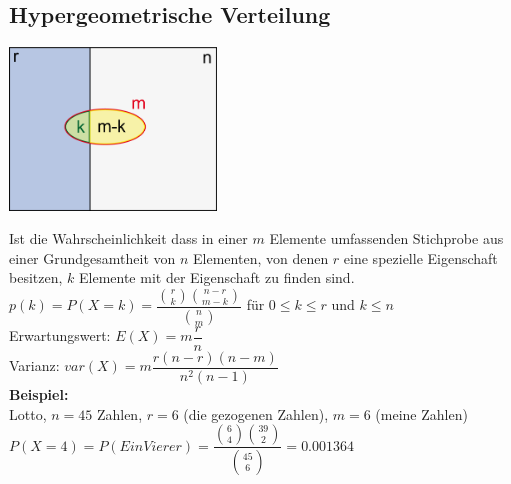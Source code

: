 	\subsection{Hypergeometrische Verteilung  }
	    \begin{floatingfigure}[r]{5.5cm}
        	\includegraphics[width=5.5cm]{./bilder/hypergeo.png}
        \end{floatingfigure}
        Ist die Wahrscheinlichkeit dass in einer $m$ Elemente umfassenden 
		Stichprobe aus einer Grundgesamtheit von $n$ Elementen, von denen $r$ eine
		spezielle Eigenschaft besitzen, $k$ Elemente mit der Eigenschaft zu
		finden sind.\\
		\vspace{5mm} 
		$p(k)=P(X=k)=\dfrac{\binom r k \binom{n-r}{m-k}}{\binom n m}$ 
        \hspace{10mm} für $0\leq k \leq r$ und $k \leq n$\\
        Erwartungswert: \hspace{10mm} $E(X)=m \dfrac{r}{n}$\\
        Varianz: \hspace{22mm} $var(X)=m \dfrac{r(n-r)(n-m)}{n^2(n-1)}$ \\
		{\bf Beispiel:} \\
		Lotto, $n=45$ Zahlen, $r=6$ (die gezogenen Zahlen), $m=6$
		(meine Zahlen) \\
		$P(X=4)=P(Ein Vierer)=\dfrac{\binom 6 4 \binom {39}
		2}{\binom {45} 6}=0.001364$	\\

